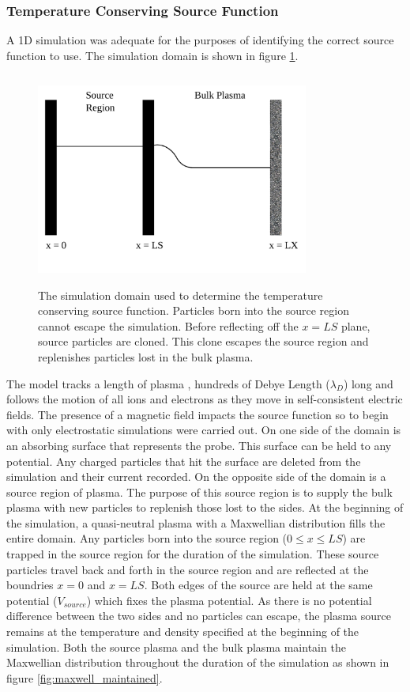 \subsubsection{Temperature Conserving Source Function}
A 1D simulation was adequate for the purposes of identifying the correct source function to use. The simulation domain is shown in figure \ref{fig:cloned_domain}. 
\begin{figure}[H]
	\centering
	\includegraphics[height=7cm,width=0.8\textwidth]{cloned_source.pdf}
	\caption{The simulation domain used to determine the temperature conserving source function. Particles born into the source region cannot escape the simulation. Before reflecting off the $x= LS$ plane, source particles are cloned. This clone escapes the source region and replenishes particles lost in the bulk plasma.}
	\label{fig:cloned_domain}
\end{figure}
The model tracks a length of plasma , hundreds of Debye Length ($\lambda_D$) long and follows the motion of all ions and electrons as they move in self-consistent electric fields. The presence of a magnetic field  impacts the source function so to begin with only electrostatic simulations were carried out. On one side of the domain is an absorbing surface that represents the probe. This surface can be held to any potential. Any charged particles that hit the surface are deleted from the simulation and their current recorded. On the opposite side of the domain is a source region of plasma. The purpose of this source region is to supply the bulk plasma with new particles to replenish those lost to the sides. At the beginning of the simulation, a quasi-neutral plasma with a Maxwellian distribution fills the entire domain. Any particles born into the source region ($0\leq x \leq LS$) are trapped in the source region for the duration of the simulation. These source particles travel back and forth in the source region and are reflected at the boundries $x=0$ and $x=LS$. Both edges of the source are held at the same potential ($V_{source}$) which fixes the plasma potential. As there is no potential difference between the two sides and no particles can escape, the plasma source remains at the temperature and density specified at the beginning of the simulation. Both the source plasma and the bulk plasma maintain the Maxwellian distribution throughout the duration of the simulation as shown in figure \ref{fig:maxwell_maintained}.
